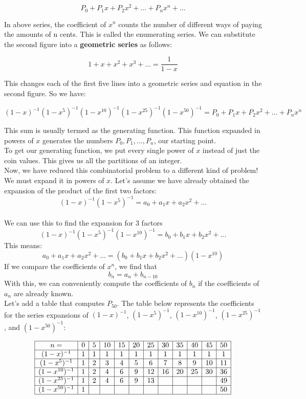 \documentclass{article}
\theoremstyle{definition}
\theoremstyle{question}
\begin{document}
\[
P_0 + P_1 x + P_2 x^2 + \dots + P_n x^n + \dots
\]

\noindent In above series, the coefficient of \(x^n\) counts the number of different ways of paying the amounts of n cents. This is called the enumerating series. We can substitute the second figure into a \textbf{geometric series} as follows:

\[
1 + x + x^2 + x^3 + \dots = \frac{1}{1-x}
\]

\noindent This changes each of the first five lines into a geometric series and equation in the second figure. So we have:

\[
(1 - x)^{-1}(1 - x^5)^{-1}(1 - x^{10})^{-1}(1 - x^{25})^{-1}(1 - x^{50})^{-1} = P_0 + P_1 x + P_2 x^2 + \dots + P_n x^n
\]

\noindent This sum is usually termed as the generating function. This function expanded in powers of \(x\) generates the numbers \(P_0, P_1, \dots, P_n\), our starting point. \\

\noindent To get our generating function, we put every single power of \(x\) instead of just the coin values. This gives us all the partitions of an integer. \\

\noindent Now, we have reduced this combinatorial problem to a different kind of problem! We must expand it in powers of \(x\). Let's assume we have already obtained the expansion of the product of the first two factors:
\[
(1 - x)^{-1}(1 - x^5)^{-1} = a_0 + a_1 x + a_2 x^2 + \dots
\] \\

\noindent  We can use this to find the expansion for 3 factors
\[
(1 - x)^{-1}(1 - x^5)^{-1}(1 - x^{10})^{-1} = b_0 + b_1 x + b_2 x^2 + \dots
\]
This means:
\[
a_0 + a_1 x + a_2 x^2 + \dots = (b_0 + b_1 x + b_2 x^2 + \dots)(1 - x^{10})
\]
If we compare the coefficients of $x^n$, we find that
\[
b_n = a_n + b_{n-10}
\]
With this, we can conveniently compute the coefficients of $b_n$ if the coefficients of $a_n$ are already known. \\

\noindent Let's add a table that computes $P_{50}$. The table below represents the coefficients for the series expansions of $(1-x)^{-1}$, $(1-x^5)^{-1}$, $(1-x^{10})^{-1}$, $(1-x^{25})^{-1}$, and $(1-x^{50})^{-1}$: 

\[
\begin{array}{|c|*{11}{c|}}
\hline
n = & 0 & 5 & 10 & 15 & 20 & 25 & 30 & 35 & 40 & 45 & 50 \\
\hline
(1 - x)^{-1} & 1 & 1 & 1 & 1 & 1 & 1 & 1 & 1 & 1 & 1 & 1 \\
\hline
(1 - x^5)^{-1} & 1 & 2 & 3 & 4 & 5 & 6 & 7 & 8 & 9 & 10 & 11 \\
\hline
(1 - x^{10})^{-1} & 1 & 2 & 4 & 6 & 9 & 12 & 16 & 20 & 25 & 30 & 36 \\
\hline
(1 - x^{25})^{-1} & 1 & 2 & 4 & 6 & 9 & 13 &  &  &  &  & 49 \\
\hline
(1 - x^{50})^{-1} & 1 &  &  &  &  &  &  &  &  &  & 50 \\
\hline
\end{array}
\]
\end{document}
